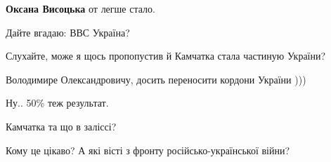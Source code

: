 \begin{itemize}
\begin{itemize}
\begin{itemize}
\textbf{Оксана Висоцька} от легше стало.
\end{itemize}


\end{itemize}

 
Дайте вгадаю: ВВС Україна?

 

Слухайте, може я щось пропопустив й Камчатка стала частиную України?

Володимире Олександровичу, досить переносити кордони України )))


 
Ну.. 50\% теж результат.

 
Камчатка та що в заліссі?

 

Кому це цікаво? А які вісті з фронту російсько-української війни?

\begin{itemize}
 

\end{itemize}
\end{itemize}

